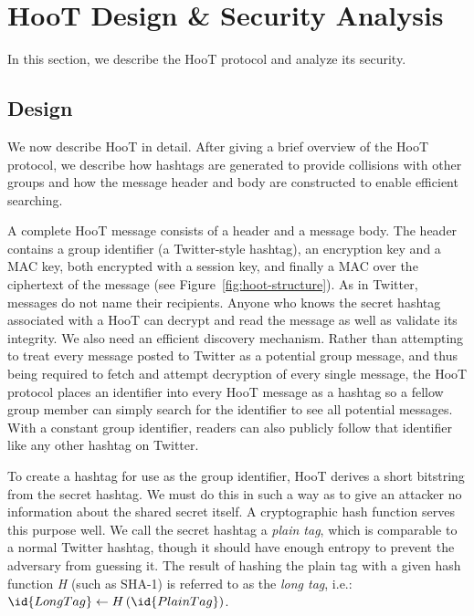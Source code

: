 \section{HooT Design \& Security Analysis}
\label{sec:design-sec}

In this section, we describe the HooT protocol and analyze its security.

\subsection{Design}
\label{sec:design}

We now describe HooT in detail. After giving a brief overview of the
HooT protocol, we describe how hashtags are generated to provide
collisions with other groups and how the message header and body are
constructed to enable efficient searching.

 A complete HooT message consists of a 
header and a message body. The header contains a group identifier
(a Twitter-style hashtag), an encryption key and a MAC key, both
encrypted with a session key, and finally a MAC
over the ciphertext of the message (see
Figure~\ref{fig:hoot-structure}). As in
Twitter, messages do not name their recipients. Anyone who knows the
secret hashtag associated with a HooT can decrypt and read the message
as well as validate its integrity.
We also need an efficient discovery mechanism.
Rather than attempting to treat every message
posted to Twitter as a potential group message, and thus being
required to fetch and attempt decryption of every single message,
the HooT protocol places an identifier into every HooT message
as a hashtag so a fellow group member can simply search for the
identifier to see all potential messages. With a constant group
identifier, readers can also publicly follow that identifier like any
other hashtag on Twitter.

 To create a hashtag for use as the group
identifier, HooT derives a short bitstring from the secret hashtag. We
must do this in such a way as to give an attacker no information about
the shared secret itself. A cryptographic hash function serves this
purpose well.
We call the secret hashtag a \textit{plain tag}, which is comparable to
a normal Twitter hashtag, though it should have enough entropy to
prevent the adversary from guessing it. The result of hashing the plain
tag with a given hash function \textit{H} (such as SHA-1) is referred to
as the \textit{long tag}, i.e.:
%
$\id{LongTag} \leftarrow H\left(\id{PlainTag}\right)$.

